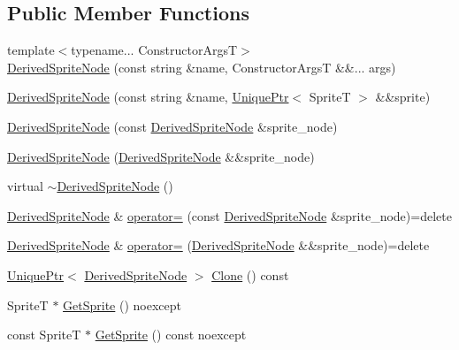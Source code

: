 \subsection*{Public Member Functions}
\begin{DoxyCompactItemize}
\item 
{\footnotesize template$<$typename... Constructor\+ArgsT$>$ }\\\hyperlink{classmage_1_1_derived_sprite_node_aa9eb13ba97d9338c67313cfc1c5108ff}{Derived\+Sprite\+Node} (const string \&name, Constructor\+ArgsT \&\&... args)
\item 
\hyperlink{classmage_1_1_derived_sprite_node_a6f7437b99be7257fa8dec2fb63002b08}{Derived\+Sprite\+Node} (const string \&name, \hyperlink{namespacemage_a3316d7143a973e37adf1110f2e80ca31}{Unique\+Ptr}$<$ SpriteT $>$ \&\&sprite)
\item 
\hyperlink{classmage_1_1_derived_sprite_node_af0e8a99b4fb15fd71f4c642999fed2cf}{Derived\+Sprite\+Node} (const \hyperlink{classmage_1_1_derived_sprite_node}{Derived\+Sprite\+Node} \&sprite\+\_\+node)
\item 
\hyperlink{classmage_1_1_derived_sprite_node_a674f95fd5fa8d3372542f2cbbc58f625}{Derived\+Sprite\+Node} (\hyperlink{classmage_1_1_derived_sprite_node}{Derived\+Sprite\+Node} \&\&sprite\+\_\+node)
\item 
virtual \hyperlink{classmage_1_1_derived_sprite_node_a0ff9a3b661a72ae3d200dfe50dc311fc}{$\sim$\+Derived\+Sprite\+Node} ()
\item 
\hyperlink{classmage_1_1_derived_sprite_node}{Derived\+Sprite\+Node} \& \hyperlink{classmage_1_1_derived_sprite_node_a1dd542f0e851b1e289bb127691f0800b}{operator=} (const \hyperlink{classmage_1_1_derived_sprite_node}{Derived\+Sprite\+Node} \&sprite\+\_\+node)=delete
\item 
\hyperlink{classmage_1_1_derived_sprite_node}{Derived\+Sprite\+Node} \& \hyperlink{classmage_1_1_derived_sprite_node_addd4a6c5019df92918e253e41f4e94ac}{operator=} (\hyperlink{classmage_1_1_derived_sprite_node}{Derived\+Sprite\+Node} \&\&sprite\+\_\+node)=delete
\item 
\hyperlink{namespacemage_a3316d7143a973e37adf1110f2e80ca31}{Unique\+Ptr}$<$ \hyperlink{classmage_1_1_derived_sprite_node}{Derived\+Sprite\+Node} $>$ \hyperlink{classmage_1_1_derived_sprite_node_a3a409447de581b0ed39625a9d3beab33}{Clone} () const
\item 
SpriteT $\ast$ \hyperlink{classmage_1_1_derived_sprite_node_a4f380d16fcd3804d08d1f6f42ecc4780}{Get\+Sprite} () noexcept
\item 
const SpriteT $\ast$ \hyperlink{classmage_1_1_derived_sprite_node_a9daf3412c118dcb50f0175d3d00be9bc}{Get\+Sprite} () const noexcept
\end{DoxyCompactItemize}
